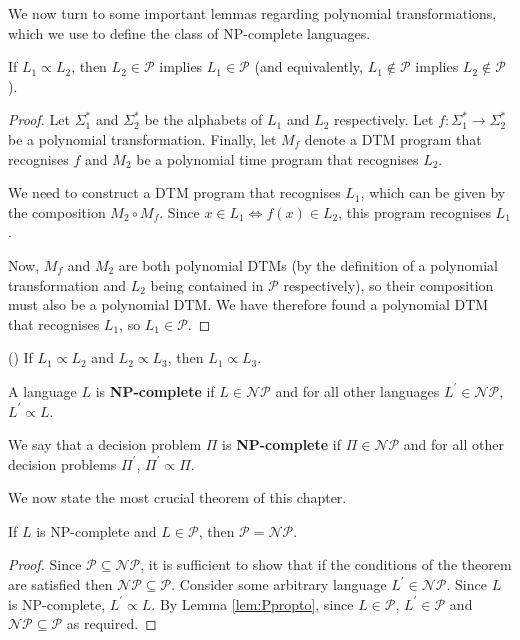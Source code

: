 We now turn to some important lemmas regarding polynomial transformations, which we use to define the class of NP-complete languages.

\begin{lemma}\label{lem:Ppropto}
    If \(L_1 \propto L_2\), then $L_2 \in \mathcal{P}$ implies $L_1 \in \mathcal{P}$ (and equivalently, $L_1 \notin \mathcal{P}$ implies $L_2 \notin \mathcal{P}$).
\end{lemma}

\begin{proof}
    Let $\Sigma_1^*$ and $\Sigma_2^*$ be the alphabets of $L_1$ and $L_2$ respectively. Let $f:\Sigma_1^* \to \Sigma_2^*$ be a polynomial transformation. Finally, let $M_f$ denote a DTM program that recognises $f$ and $M_2$ be a polynomial time program that recognises $L_2$.

    We need to construct a DTM program that recognises $L_1$, which can be given by the composition $M_2 \circ M_f$. Since $x \in L_1 \iff f(x) \in L_2$, this program recognises $L_1$.

    Now, $M_f$ and $M_2$ are both polynomial DTMs (by the definition of a polynomial transformation and $L_2$ being contained in $\mathcal{P}$ respectively), so their composition must also be a polynomial DTM. We have therefore found a polynomial DTM that recognises $L_1$, so $L_1 \in \mathcal{P}$.
\end{proof}

\begin{lemma}\label{lem:transitive}
    (\cite{GareyMichaelR1979Cai:}) If $L_1 \propto L_2$ and $L_2 \propto L_3$, then $L_1 \propto L_3$.
\end{lemma}

\begin{definition}
    A language $L$ is \textbf{NP-complete} if $L \in \mathcal{NP}$ and for all other languages $L^{\prime} \in \mathcal{NP}$, $L^{\prime} \propto L$.
\end{definition}

\begin{remark}
    We say that a decision problem $\Pi$ is \textbf{NP-complete} if $\Pi \in \mathcal{NP}$ and for all other decision problems $\Pi^{\prime}$, $\Pi^{\prime} \propto \Pi$.
\end{remark}

We now state the most crucial theorem of this chapter.

\begin{theorem}
    If $L$ is NP-complete and $L \in \mathcal{P}$, then $\mathcal{P} = \mathcal{NP}$.
\end{theorem}

\begin{proof}
    Since $\mathcal{P} \subseteq \mathcal{NP}$, it is sufficient to show that if the conditions of the theorem are satisfied then $\mathcal{NP} \subseteq \mathcal{P}$. Consider some arbitrary language $L^{\prime} \in \mathcal{NP}$. Since $L$ is NP-complete, $L^{\prime} \propto L$. By Lemma \ref{lem:Ppropto}, since $L \in \mathcal{P}$, $L^{\prime} \in \mathcal{P}$ and $\mathcal{NP} \subseteq \mathcal{P}$ as required.
\end{proof}